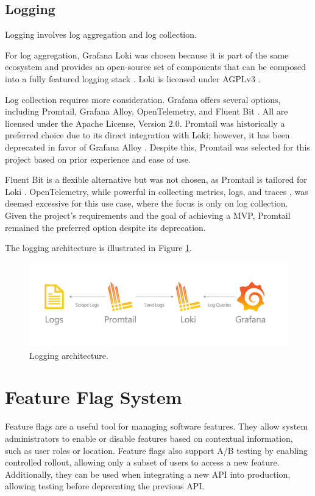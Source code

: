 \subsection{Logging}
Logging involves log aggregation and log collection.

For log aggregation, Grafana Loki was chosen because it is part of the same ecosystem and provides an open-source set of components that can be composed into a fully featured logging stack \parencite{grafana_loki}. Loki is licensed under AGPLv3 \cite{grafana_loki_license}.

Log collection requires more consideration. Grafana offers several options, including Promtail, Grafana Alloy, OpenTelemetry, and Fluent Bit \cite{grafana_loki_send_data}. All are licensed under the Apache License, Version 2.0. Promtail was historically a preferred choice due to its direct integration with Loki; however, it has been deprecated in favor of Grafana Alloy \cite{grafana_promtail}. Despite this, Promtail was selected for this project based on prior experience and ease of use.

Fluent Bit is a flexible alternative but was not chosen, as Promtail is tailored for Loki \cite{grafana_loki_send_data}. OpenTelemetry, while powerful in collecting metrics, logs, and traces \cite{opentelemetry_overview}, was deemed excessive for this use case, where the focus is only on log collection. Given the project's requirements and the goal of achieving a MVP, Promtail remained the preferred option despite its deprecation.

The logging architecture is illustrated in Figure \ref{fig:logging_architecture}.

\begin{figure}[h]
    \centering
    \includegraphics[width=1\textwidth]{./images/loki-promtail.png}
    \caption{Logging architecture.}
    \label{fig:logging_architecture}
\end{figure}

\section{Feature Flag System}
Feature flags are a useful tool for managing software features. They allow system administrators to enable or disable features based on contextual information, such as user roles or location. Feature flags also support A/B testing by enabling controlled rollout, allowing only a subset of users to access a new feature. Additionally, they can be used when integrating a new API into production, allowing testing before deprecating the previous API.

